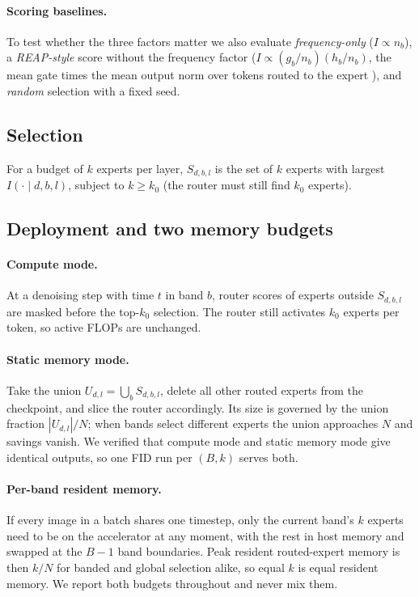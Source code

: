 \paragraph{Scoring baselines.}
To test whether the three factors matter we also evaluate \emph{frequency-only} ($I\propto n_b$), a \emph{REAP-style} score without the frequency factor ($I\propto (g_b/n_b)(h_b/n_b)$, the mean gate times the mean output norm over tokens routed to the expert \citep{lasby2025reap}), and \emph{random} selection with a fixed seed. 

\subsection{Selection}\label{sec:selection}
For a budget of $k$ experts per layer, $S_{d,b,l}$ is the set of $k$ experts with largest $I(\cdot\mid d,b,l)$, subject to $k\ge k_0$ (the router must still find $k_0$ experts).

\subsection{Deployment and two memory budgets}\label{sec:deploy}
\paragraph{Compute mode.} At a denoising step with time $t$ in band $b$, router scores of experts outside $S_{d,b,l}$ are masked before the top-$k_0$ selection. The router still activates $k_0$ experts per token, so active FLOPs are unchanged.
\paragraph{Static memory mode.} Take the union $U_{d,l}=\bigcup_b S_{d,b,l}$, delete all other routed experts from the checkpoint, and slice the router accordingly. Its size is governed by the union fraction $|U_{d,l}|/N$; when bands select different experts the union approaches $N$ and savings vanish. We verified that compute mode and static memory mode give identical outputs, so one FID run per $(B,k)$ serves both.
\paragraph{Per-band resident memory.} If every image in a batch shares one timestep, only the current band's $k$ experts need to be on the accelerator at any moment, with the rest in host memory and swapped at the $B-1$ band boundaries. Peak resident routed-expert memory is then $k/N$ for banded and global selection alike, so equal $k$ is equal resident memory. 
We report both budgets throughout and never mix them.


